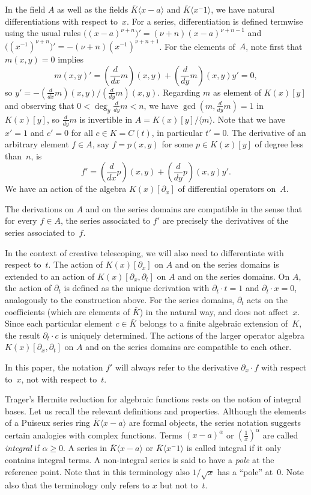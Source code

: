 \documentclass{sig-alternate}
\def\<#1>{\langle#1\rangle}
\begin{document}
In the field $A$ as well as the fields $\bar K\<x-a>$ and $\bar K\<x^{-1}>$, we have
natural differentiations with respect to~$x$. For a series, differentiation is defined
termwise using the usual rules $\bigl((x-a)^{\nu+n}\bigr)'=(\nu+n)(x-a)^{\nu+n-1}$ and
$\bigl((x^{-1})^{\nu+n}\bigr)'=-(\nu+n)(x^{-1})^{\nu+n+1}$. For the elements of~$A$, note
first that $m(x,y)=0$ implies
\begin{equation}\label{eq:yprime}
  m(x,y)'=(\frac d{dx}m)(x,y) + (\frac d{dy}m)(x,y)y' = 0,
\end{equation}
so $y'=-(\frac d{dx}m)(x,y)/(\frac d{dy}m)(x,y)$. Regarding $m$ as element of $K(x)[y]$
and observing that $0<\deg_y\frac d{dy}m<n$, we have $\gcd(m,\frac d{dy}m)=1$ in $K(x)[y]$,
so $\frac{d}{dy}m$ is invertible in $A=K(x)[y]/\<m>$.
Note that we have $x'=1$ and $c'=0$ for all $c\in K=C(t)$, in particular $t'=0$.
The derivative of an arbitrary
element $f\in A$, say $f=p(x,y)$ for some $p\in K(x)[y]$ of degree less than~$n$, is
\[f'=(\frac{d}{dx}p)(x,y)+(\frac d{dy}p)(x,y)y'.\]
We have an action of the algebra $K(x)[\partial_x]$ of differential operators on~$A$.

The derivations on $A$ and on the series domains are compatible in the sense
that for every $f\in A$, the series associated to $f'$ are precisely the
derivatives of the series associated to~$f$.

In the context of creative telescoping, we will also need to differentiate with
respect to~$t$. The action of $K(x)[\partial_x]$ on $A$ and on the series domains
is extended to an action of $K(x)[\partial_x,\partial_t]$ on $A$ and on the series
domains. On $A$, the action of $\partial_t$ is defined as the unique derivation with
$\partial_t\cdot t=1$ and $\partial_t\cdot x=0$, analogously to the construction
above. For the series domains, $\partial_t$ acts on the coefficients
(which are elements of $\bar K$) in the natural way, and does not affect~$x$.
Since each particular element $c\in\bar K$ belongs to a finite algebraic extension of~$K$,
the result $\partial_t\cdot c$ is uniquely determined.
The actions of the larger operator algebra
$K(x)[\partial_x,\partial_t]$ on $A$ and on the series domains are compatible to
each other.

In this paper, the notation $f'$ will always refer to the derivative $\partial_x\cdot f$
with respect to~$x$, not with respect to~$t$.

\medskip

Trager's Hermite reduction for algebraic functions rests on the notion of
integral bases. Let us recall the relevant definitions and properties.
Although the elements of a Puiseux series ring $\bar K\<x-a>$ are formal
objects, the series notation suggests certain analogies with complex
functions. Terms $(x-a)^\alpha$ or $(\tfrac1x)^\alpha$ are
called \emph{integral} if $\alpha\geq0$. A series in
$\bar K\<x-a>$ or $\bar K\<x^{-1}>$ is called integral if it only contains integral
terms. A non-integral series is said to have a \emph{pole} at the reference
point. Note that in this terminology also $1/\sqrt{x}$ has a ``pole''
at~$0$. Note also that the terminology only refers to $x$ but not to~$t$.
\end{document}
